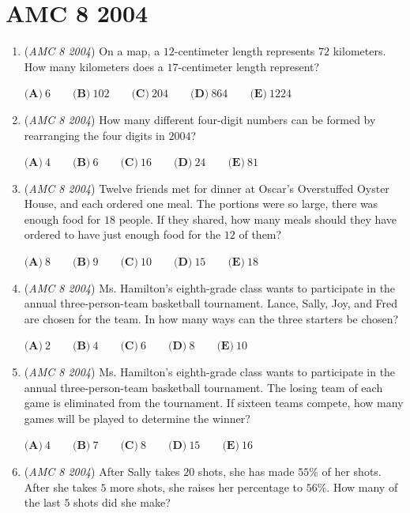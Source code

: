 \section{AMC 8 2004}
        \begin{enumerate}
        	\item (\textit{AMC 8 2004}) On a map, a $12$-centimeter length represents $72$ kilometers. How many kilometers does a $17$-centimeter length represent?


 $\textbf{(A)}\ 6\qquad\textbf{(B)}\ 102\qquad\textbf{(C)}\ 204\qquad\textbf{(D)}\ 864\qquad\textbf{(E)}\ 1224$


	\item (\textit{AMC 8 2004}) How many different four-digit numbers can be formed by rearranging the four digits in $2004$?


 $\textbf{(A)}\ 4\qquad\textbf{(B)}\ 6\qquad\textbf{(C)}\ 16\qquad\textbf{(D)}\ 24\qquad\textbf{(E)}\ 81$


	\item (\textit{AMC 8 2004}) Twelve friends met for dinner at Oscar's Overstuffed Oyster House, and each ordered one meal. The portions were so large, there was enough food for $18$ people. If they shared, how many meals should they have ordered to have just enough food for the $12$ of them?


 $\textbf{(A)}\ 8\qquad\textbf{(B)}\ 9\qquad\textbf{(C)}\ 10\qquad\textbf{(D)}\ 15\qquad\textbf{(E)}\ 18$


	\item (\textit{AMC 8 2004}) Ms. Hamilton’s eighth-grade class wants to participate in the annual three-person-team basketball tournament. Lance, Sally, Joy, and Fred are chosen for the team. In how many ways can the three starters be chosen?


 $\textbf{(A)}\ 2\qquad\textbf{(B)}\ 4\qquad\textbf{(C)}\ 6\qquad\textbf{(D)}\ 8\qquad\textbf{(E)}\ 10$


	\item (\textit{AMC 8 2004}) Ms. Hamilton's eighth-grade class wants to participate in the annual three-person-team basketball tournament. The losing team of each game is eliminated from the tournament. If sixteen teams compete, how many games will be played to determine the winner?


 $\textbf{(A)}\ 4\qquad\textbf{(B)}\ 7\qquad\textbf{(C)}\ 8\qquad\textbf{(D)}\ 15\qquad\textbf{(E)}\ 16$


	\item (\textit{AMC 8 2004}) After Sally takes $20$ shots, she has made $55\%$ of her shots. After she takes $5$ more shots, she raises her percentage to $56\%$. How many of the last $5$ shots did she make?



\end{enumerate}
